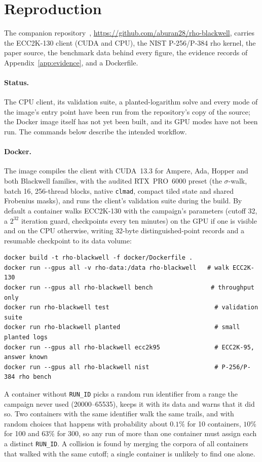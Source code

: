 \appendix
\section{Reproduction}
\label{app:repro}

The companion repository~\cite{rhoblackwell}, \url{https://github.com/aburan28/rho-blackwell}, carries the
ECC2K-130 client (CUDA and CPU), the NIST P-256/P-384 rho kernel, the
paper source, the benchmark data behind every figure, the evidence
records of Appendix~\ref{app:evidence}, and a Dockerfile.

\paragraph{Status.} The CPU client, its validation suite, a
planted-logarithm solve and every mode of the image's entry point have
been run from the repository's copy of the source; the Docker image
itself has not yet been built, and its GPU modes have not been run. The
commands below describe the intended workflow.

\paragraph{Docker.} The image compiles the client with CUDA~13.3 for
Ampere, Ada, Hopper and both Blackwell families, with the audited
RTX~PRO~6000 preset (the $\sigma$-walk, batch 16, 256-thread blocks,
native \texttt{clmad}, compact tiled state and shared Frobenius masks),
and runs the client's validation suite during the build. By default a
container walks ECC2K-130 with the campaign's parameters (cutoff 32, a
$2^{32}$ iteration guard, checkpoints every ten minutes) on the GPU if one
is visible and on the CPU otherwise, writing 32-byte distinguished-point
records and a resumable checkpoint to its data volume:
{\small\begin{verbatim}
docker build -t rho-blackwell -f docker/Dockerfile .
docker run --gpus all -v rho-data:/data rho-blackwell   # walk ECC2K-130
docker run --gpus all rho-blackwell bench                # throughput only
docker run rho-blackwell test                             # validation suite
docker run rho-blackwell planted                          # small planted logs
docker run --gpus all rho-blackwell ecc2k95               # ECC2K-95, answer known
docker run --gpus all rho-blackwell nist                  # P-256/P-384 rho bench
\end{verbatim}}
A container without \texttt{RUN\_ID} picks a random run identifier from
a range the campaign never used (20000--65535), keeps it with its data
and warns that it did so. Two containers with the same identifier walk
the same trails, and with random choices that happens with probability
about $0.1\%$ for 10 containers, $10\%$ for 100 and $63\%$ for 300, so any
run of more than one container must assign each a distinct
\texttt{RUN\_ID}. A collision is
found by merging the corpora of all containers that walked with the
same cutoff; a single container is unlikely to find one alone.

